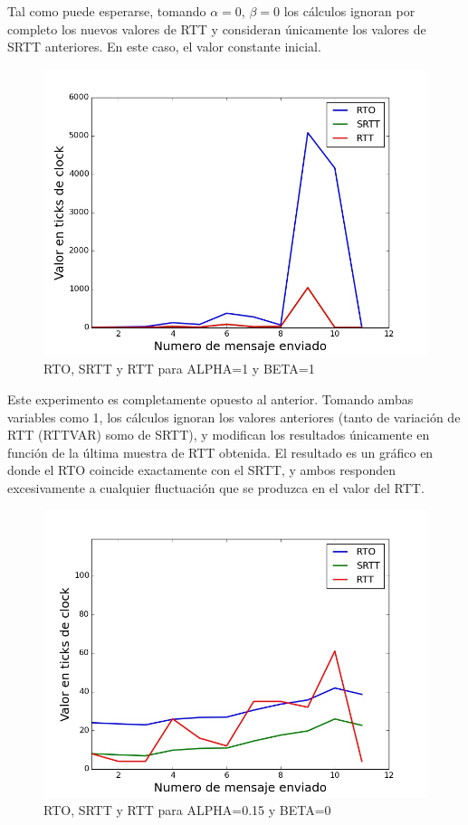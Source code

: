 Tal como puede esperarse, tomando $\alpha=0$, $\beta=0$ los cálculos ignoran por completo los nuevos
valores de RTT y consideran únicamente los valores de SRTT anteriores. En este caso, el valor constante
inicial.

\begin{figure}[H]
  \begin{center}
      \includegraphics[scale=0.32]{imagenes/ALPHA_1_BETA_1.jpg}
      \caption{RTO, SRTT y RTT para ALPHA=1 y BETA=1}
  \end{center}
\end{figure}

Este experimento es completamente opuesto al anterior. Tomando ambas variables como 1, los cálculos
ignoran los valores anteriores (tanto de variación de RTT (RTTVAR) somo de SRTT), y modifican
los resultados únicamente en función de la última muestra de RTT obtenida. El resultado es un gráfico
en donde el RTO coincide exactamente con el SRTT, y ambos responden excesivamente a cualquier fluctuación
que se produzca en el valor del RTT.

\begin{figure}[H]
  \begin{center}
      \includegraphics[scale=0.32]{imagenes/ALPHA_015_BETA_0.jpg}
      \caption{RTO, SRTT y RTT para ALPHA=0.15 y BETA=0}
  \end{center}
\end{figure}

